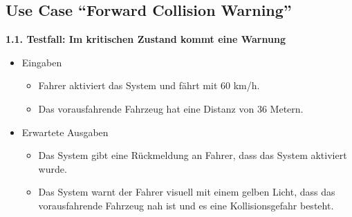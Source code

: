 \subsection{Use Case \enquote{Forward Collision Warning}}
\textbf{1.1. Testfall: Im kritischen Zustand kommt eine Warnung}
\begin{itemize}
	\item Eingaben
	\begin{itemize}
		\item Fahrer aktiviert das System und fährt mit 60 km/h.
		\item Das vorausfahrende Fahrzeug hat eine Distanz von 36 Metern.
	\end{itemize}
	\item Erwartete Ausgaben
	\begin{itemize}
		\item Das System gibt eine Rückmeldung an Fahrer, dass das System aktiviert wurde.
		\item Das System warnt der Fahrer visuell mit einem gelben Licht, dass das vorausfahrende Fahrzeug nah ist und es eine Kollisionsgefahr besteht.
	\end{itemize}
\end{itemize}
